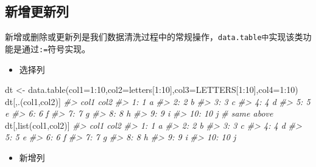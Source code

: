 \documentclass[
]{book}
\newenvironment{Shaded}{\begin{snugshade}}{\end{snugshade}}
\newcommand{\AttributeTok}[1]{\textcolor[rgb]{0.77,0.63,0.00}{#1}}
\newcommand{\CommentTok}[1]{\textcolor[rgb]{0.56,0.35,0.01}{\textit{#1}}}
\newcommand{\DecValTok}[1]{\textcolor[rgb]{0.00,0.00,0.81}{#1}}
\newcommand{\FunctionTok}[1]{\textcolor[rgb]{0.00,0.00,0.00}{#1}}
\newcommand{\NormalTok}[1]{#1}
\newcommand{\OtherTok}[1]{\textcolor[rgb]{0.56,0.35,0.01}{#1}}
\newcommand{\SpecialCharTok}[1]{\textcolor[rgb]{0.00,0.00,0.00}{#1}}
\providecommand{\tightlist}{%
  \setlength{\itemsep}{0pt}\setlength{\parskip}{0pt}}
\begin{document}
\hypertarget{ux65b0ux589eux66f4ux65b0ux5217}{%
\subsection{新增更新列}\label{ux65b0ux589eux66f4ux65b0ux5217}}

新增或删除或更新列是我们数据清洗过程中的常规操作，\texttt{data.table中}实现该类功能是通过\texttt{:=}符号实现。

\begin{itemize}
\tightlist
\item
  选择列
\end{itemize}

\begin{Shaded}
\begin{Highlighting}[]
\NormalTok{dt }\OtherTok{\textless{}{-}} \FunctionTok{data.table}\NormalTok{(}\AttributeTok{col1=}\DecValTok{1}\SpecialCharTok{:}\DecValTok{10}\NormalTok{,}\AttributeTok{col2=}\NormalTok{letters[}\DecValTok{1}\SpecialCharTok{:}\DecValTok{10}\NormalTok{],}\AttributeTok{col3=}\NormalTok{LETTERS[}\DecValTok{1}\SpecialCharTok{:}\DecValTok{10}\NormalTok{],}\AttributeTok{col4=}\DecValTok{1}\SpecialCharTok{:}\DecValTok{10}\NormalTok{)}
\NormalTok{dt[,.(col1,col2)]}
\CommentTok{\#\textgreater{}     col1 col2}
\CommentTok{\#\textgreater{}  1:    1    a}
\CommentTok{\#\textgreater{}  2:    2    b}
\CommentTok{\#\textgreater{}  3:    3    c}
\CommentTok{\#\textgreater{}  4:    4    d}
\CommentTok{\#\textgreater{}  5:    5    e}
\CommentTok{\#\textgreater{}  6:    6    f}
\CommentTok{\#\textgreater{}  7:    7    g}
\CommentTok{\#\textgreater{}  8:    8    h}
\CommentTok{\#\textgreater{}  9:    9    i}
\CommentTok{\#\textgreater{} 10:   10    j}
\CommentTok{\# same above}
\NormalTok{dt[,}\FunctionTok{list}\NormalTok{(col1,col2)]}
\CommentTok{\#\textgreater{}     col1 col2}
\CommentTok{\#\textgreater{}  1:    1    a}
\CommentTok{\#\textgreater{}  2:    2    b}
\CommentTok{\#\textgreater{}  3:    3    c}
\CommentTok{\#\textgreater{}  4:    4    d}
\CommentTok{\#\textgreater{}  5:    5    e}
\CommentTok{\#\textgreater{}  6:    6    f}
\CommentTok{\#\textgreater{}  7:    7    g}
\CommentTok{\#\textgreater{}  8:    8    h}
\CommentTok{\#\textgreater{}  9:    9    i}
\CommentTok{\#\textgreater{} 10:   10    j}
\end{Highlighting}
\end{Shaded}

\begin{itemize}
\tightlist
\item
  新增列
\end{itemize}
\end{document}
